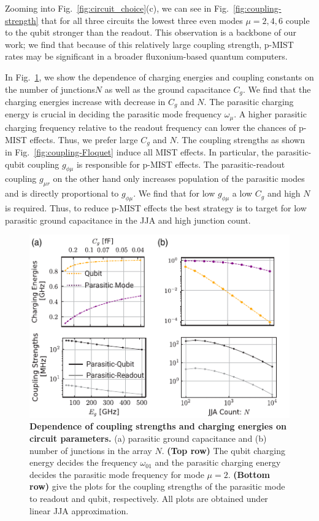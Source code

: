\documentclass[%
reprint,
superscriptaddress,
 amsmath,amssymb,
 aps,
 prx,
longbibliography,
floatfix,
]{revtex4-2}
\begin{document}
Zooming into Fig.~\ref{fig:circuit_choice}(c), we can see in Fig.~\ref{fig:coupling-strength} that for all three circuits the lowest three even modes $\mu=2,4,6$ couple to the qubit stronger than the readout. This observation is a backbone of our work; we find that because of this relatively large coupling strength, p-MIST rates may be significant in a broader fluxonium-based quantum computers.

In Fig.~\ref{fig:circuit_comp}, we show the dependence of charging energies and coupling constants on the number of junctions$N$ as well as the ground capacitance $C_g$. We find that the charging energies increase with decrease in $C_g$ and $N$. The parasitic charging energy is crucial in deciding the parasitic mode frequency $\omega_{\mu}$. A higher parasitic charging frequency relative to the readout frequency can lower the chances of p-MIST effects. Thus, we prefer large $C_g$ and $N$. The coupling strengths as shown in Fig.~\ref{fig:coupling-Floquet} induce all MIST effects. In particular, the parasitic-qubit coupling $g_{\phi\mu}$ is responsible for p-MIST effects. The parasitic-readout coupling $g_{\mu r}$ on the other hand only increases population  of the parasitic modes and is directly proportional to $g_{\phi\mu}$. We find that for low $g_{\phi\mu}$ a low $C_g$ and high $N$ is required. Thus, to reduce p-MIST effects the best strategy is to target for low parasitic ground capacitance in the JJA and high junction count.
\begin{figure}[t]
    \centering
    \includegraphics[width=\linewidth]{Supp_Fig/Circuit_comp.pdf}
    \caption{{\bf Dependence of coupling strengths and charging energies on circuit parameters.} (a) parasitic ground capacitance and (b) number of junctions in the array $N$. {\bf (Top row)} The qubit charging energy decides the frequency $\omega_{01}$ and the parasitic charging energy decides the parasitic mode frequency for mode $\mu=2$. {\bf (Bottom row)} give the plots for the coupling strengths of the parasitic mode to readout and qubit, respectively. All plots are obtained under linear JJA approximation.}
    \label{fig:circuit_comp}
\end{figure}
\end{document}
